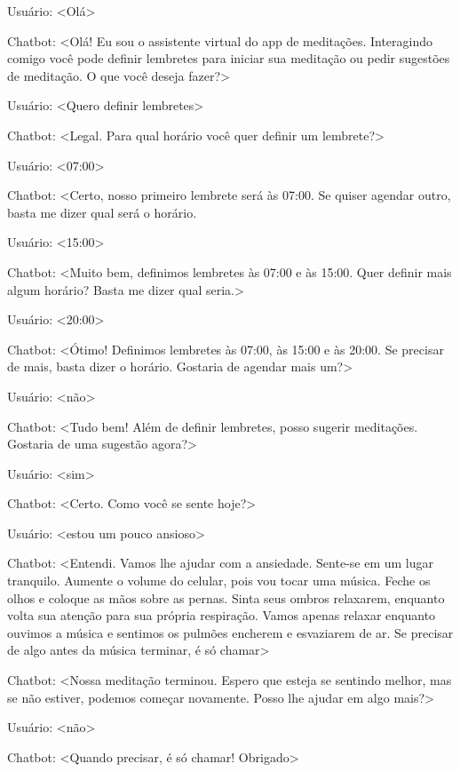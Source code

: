 Usuário: <Olá>

Chatbot: <Olá! Eu sou o assistente virtual do app de meditações. Interagindo comigo você pode definir lembretes para iniciar sua meditação ou pedir sugestões de meditação. O que você deseja fazer?>

Usuário: <Quero definir lembretes>

Chatbot: <Legal. Para qual horário você quer definir um lembrete?>

Usuário: <07:00>

Chatbot: <Certo, nosso primeiro lembrete será às 07:00. Se quiser agendar outro, basta me dizer qual será o horário.

Usuário: <15:00>

Chatbot: <Muito bem, definimos lembretes às 07:00 e às 15:00. Quer definir mais algum horário? Basta me dizer qual seria.>

Usuário: <20:00>

Chatbot: <Ótimo! Definimos lembretes às 07:00, às 15:00 e às 20:00. Se precisar de mais, basta dizer o horário. Gostaria de agendar mais um?>

Usuário: <não>

Chatbot: <Tudo bem! Além de definir lembretes, posso sugerir meditações. Gostaria de uma sugestão agora?>

Usuário: <sim>

Chatbot: <Certo. Como você se sente hoje?>

Usuário: <estou um pouco ansioso>

Chatbot: <Entendi. Vamos lhe ajudar com a ansiedade. Sente-se em um lugar tranquilo. Aumente o volume do celular, pois vou tocar uma música. Feche os olhos e coloque as mãos sobre as pernas. Sinta seus ombros relaxarem, enquanto volta sua atenção para sua própria respiração. Vamos apenas relaxar enquanto ouvimos a música e sentimos os pulmões encherem e esvaziarem de ar. Se precisar de algo antes da música terminar, é só chamar>

Chatbot: <Nossa meditação terminou. Espero que esteja se sentindo melhor, mas se não estiver, podemos começar novamente. Posso lhe ajudar em algo mais?>

Usuário: <não>

Chatbot: <Quando precisar, é só chamar! Obrigado>